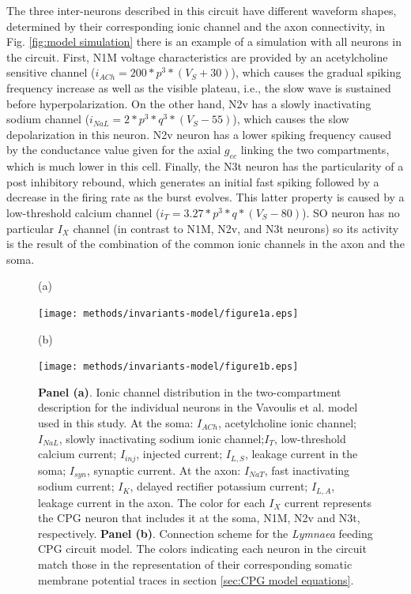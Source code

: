 The three inter-neurons described in this circuit have different waveform shapes, determined by their corresponding ionic channel and the axon connectivity, in Fig. \ref{fig:model simulation} there is an example of a simulation with all neurons in the circuit. First, N1M voltage characteristics are provided by an acetylcholine sensitive channel (\(i_{ACh} = 200 * p^3 * (V_S + 30)\)), which causes the gradual spiking frequency increase as well as the visible plateau, i.e., the slow wave is sustained before hyperpolarization. On the other hand, N2v has a slowly inactivating sodium channel (\(i_{NaL} = 2 * p^3 * q^3 * (V_S-55)\)), which causes the slow depolarization in this neuron. N2v neuron has a lower spiking frequency caused by the conductance value given for the axial $g_{ec}$ linking the two compartments, which is much lower in this cell. Finally, the N3t neuron has the particularity of a post inhibitory rebound, which generates an initial fast spiking followed by a decrease in the firing rate as the burst evolves. This latter property is caused by a low-threshold calcium channel (\( i_T = 3.27 * p^3 * q *(V_S-80)\)). SO neuron has no particular  \(I_X\) channel (in contrast to N1M, N2v, and N3t neurons) so its activity is the result of the combination of the common ionic channels in the axon and the soma.


\begin{figure}[htb!]
	\centering
	\begin{minipage}[t]{0.45\textwidth}
		\raggedright
		(a) \par
		\vspace{65pt}
		\centering
		\texttt{[image: methods/invariants-model/figure1a.eps]}
	\end{minipage}\hfill
	\begin{minipage}[t]{0.35\textwidth}
		\raggedright
		(b) \par
		\centering
		\texttt{[image: methods/invariants-model/figure1b.eps]}
	\end{minipage}
	\caption{\textbf{Panel (a)}. Ionic channel distribution in the two-compartment description for the individual neurons in the Vavoulis et al. model used in this study. At the soma: $I_{ACh}$, acetylcholine ionic channel; $I_{NaL}$, slowly inactivating sodium
		ionic channel;$I_T$, low-threshold calcium current; $I_{inj}$, injected current; $I_{L,S}$, leakage current in the soma; $I_{syn}$, synaptic current. At the axon: $I_{NaT}$, fast inactivating sodium current; $I_K$, delayed rectifier potassium current; $I_{L,A}$, leakage current in the axon. The color for each $I_X$ current represents the CPG neuron that includes it at the soma,  N1M, N2v and N3t, respectively. \textbf{Panel (b)}. Connection scheme for the {\sl Lymnaea} feeding CPG circuit model. The colors indicating each neuron in the circuit match those in the representation of their corresponding somatic membrane potential traces in section \ref{sec:CPG model equations}. 
	}
	\label{fig:CPG diagram 2 compartments}
\end{figure}

